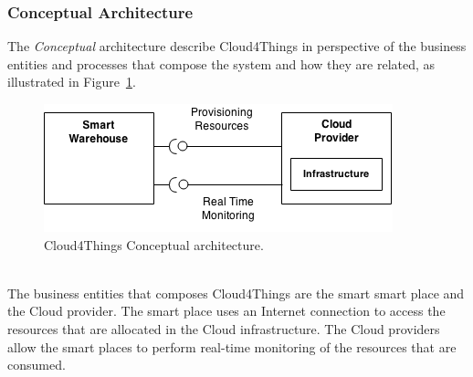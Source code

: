 \subsubsection{Conceptual Architecture}
\label{subs:conceptual_architecture}
The \textit{Conceptual} architecture describe Cloud4Things in perspective of
the business entities and processes that compose the system and how they are related,
as illustrated in Figure~\ref{fig:conceptual_architecture}.
\begin{figure}[h!]
  \centering
  \includegraphics[width=.8\textwidth]{./images/conceptual-architecture}
  \caption{Cloud4Things Conceptual architecture.}
  \label{fig:conceptual_architecture}
\end{figure}\\
The business entities that composes Cloud4Things are the smart smart place and the
Cloud provider. The smart place uses an Internet connection to access the resources
that are allocated in the Cloud infrastructure. The Cloud providers allow the smart
places to perform real-time monitoring of the resources that are consumed.
